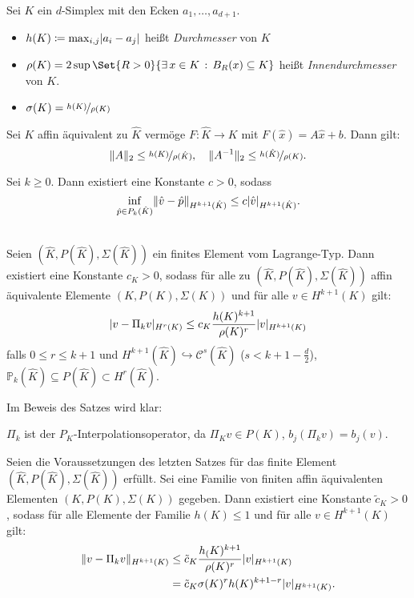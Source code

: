 \documentclass{cheat-sheet}
\newcommand{\Cont}{\mathcal{C}} %
\begin{document}

\begin{defn}
  Sei $K$ ein $d$-Simplex mit den Ecken $a_1, \ldots, a_{d+1}$.
  \begin{itemize}
    \item $h(K) \coloneqq \max_{i,j} \lvert a_i - a_j\rvert$ heißt \emph{Durchmesser} von $K$
    \item $\rho(K) = 2 \sup \Set{R > 0}{\ex{x \in K} B_R(x) \subseteq K}$ heißt \emph{Innendurchmesser} von $K$.
    \item $\sigma(K) = \nicefrac{h(K)}{\rho(K)}$
  \end{itemize}
\end{defn}

\begin{lem}
  Sei $K$ affin äquivalent zu $\hat{K}$ vermöge $F : \hat{K} \to K$ mit $F(\hat{x}) = A \hat{x} + b$.
  Dann gilt:
  \[
    \lVert A\rVert_2 \leq \nicefrac{h(K)}{\rho(\hat{K})}, \quad
    \lVert A^{-1}\rVert_2 \leq \nicefrac{h(\hat{K})}{\rho(K)}.
  \]
\end{lem}

\begin{lem}
  Sei $k \geq 0$.
  Dann existiert eine Konstante $c > 0$, sodass
  \[
    \inf_{\hat{p} \in P_k(\hat{K})} \lVert\hat{v} - \hat{p}\rVert_{H^{k+1}(\hat{K})} \leq c \lvert\hat{v}\rvert_{H^{k+1}(\hat{K})}.
  \]
\end{lem}

\begin{satz} \mbox{} \\
  Seien $(\hat{K}, P(\hat{K}), \Sigma(\hat{K}))$ ein finites Element vom Lagrange-Typ.
  Dann existiert eine Konstante $c_K > 0$, sodass für alle zu $(\hat{K}, P(\hat{K}), \Sigma (\hat{K}))$ affin äquivalente Elemente $(K, P(K), \Sigma(K))$ und für alle $v \in H^{k+1}(K)$ gilt:
  \[
    \lvert v - \Pi_k v\rvert_{H^r(K)} \leq c_K \frac{h(K)^{k+1}}{\rho(K)^r} \lvert v\rvert_{H^{k+1}(K)}
  \]
  falls $0 \leq r \leq k+1$ und $H^{k+1}(\hat{K}) \hookrightarrow \Cont^s(\hat{K})$ ($s < k+1-\tfrac{d}{2}$), $\mathbb{P}_k(\hat{K}) \subseteq P(\hat{K}) \subset H^r(\hat{K})$.
\end{satz}

Im Beweis des Satzes wird klar:

$\Pi_k$ ist der $P_K$-Interpolationsoperator, da $\Pi_K v \in P(K)$, $b_j (\Pi_k v) = b_j(v)$.

\begin{kor}
  Seien die Voraussetzungen des letzten Satzes für das finite Element $(\hat{K}, P(\hat{K}), \Sigma(\hat{K}))$ erfüllt.
  Sei eine Familie von finiten affin äquivalenten Elementen $(K, P(K), \Sigma(K))$ gegeben.
  Dann existiert eine Konstante $\tilde{c}_K > 0$, sodass für alle Elemente der Familie $h(K) \leq 1$ und für alle $v \in H^{k+1}(K)$ gilt:
  \begin{align*}
    \lVert v - \Pi_k v\rVert_{H^{k+1}(K)} & \leq \tilde{c}_K \frac{h_(K)^{k+1}}{\rho(K)^r} \lvert v\rvert_{H^{k+1}(K)} \\
    & = \tilde{c}_K \sigma(K)^r h(K)^{k+1-r} \lvert v\rvert_{H^{k+1}(K)}.
  \end{align*}
\end{kor}
\end{document}
